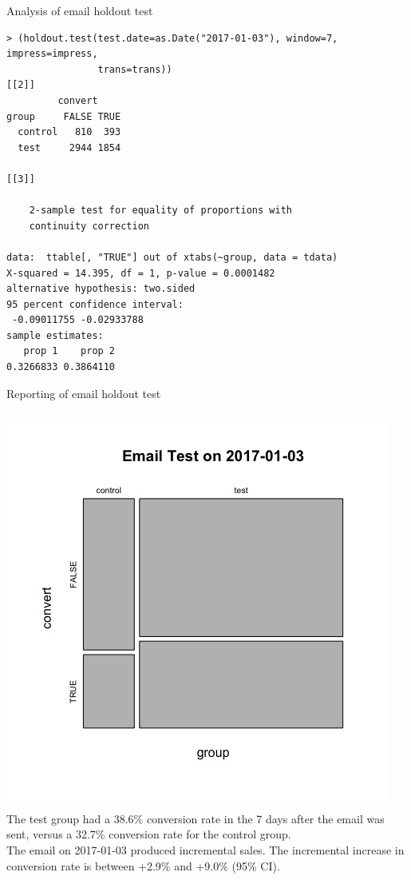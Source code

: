 \documentclass[10pt, aspectratio=169]{beamer}
\begin{document}
\begin{frame}[fragile]{Analysis of email holdout test}
\begin{lstlisting}[basicstyle=\scriptsize\ttfamily]
> (holdout.test(test.date=as.Date("2017-01-03"), window=7, impress=impress, 
                trans=trans))
[[2]]
         convert
group     FALSE TRUE
  control   810  393
  test     2944 1854

[[3]]

	2-sample test for equality of proportions with
	continuity correction

data:  ttable[, "TRUE"] out of xtabs(~group, data = tdata)
X-squared = 14.395, df = 1, p-value = 0.0001482
alternative hypothesis: two.sided
95 percent confidence interval:
 -0.09011755 -0.02933788
sample estimates:
   prop 1    prop 2 
0.3266833 0.3864110
\end{lstlisting}
\end{frame}

\begin{frame}{Reporting of email holdout test}
\begin{columns}
\includegraphics[width=\textwidth]{images/test1.jpeg}
The test group had a 38.6\% conversion rate in the 7 days after the email was sent, versus a 32.7\% conversion rate for the control group. \\
\bigskip \pause
\alert{The email on 2017-01-03 produced incremental sales. The incremental increase in conversion rate is between +2.9\% and +9.0\% (95\% CI).} \\
\end{columns}
\end{frame}
\end{document}
